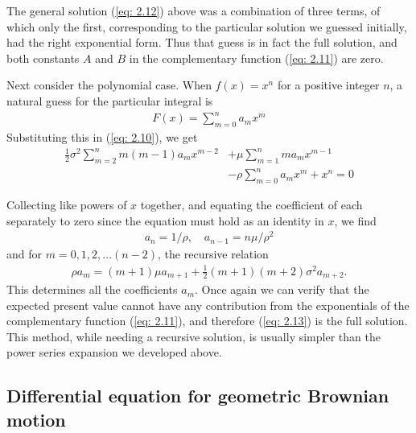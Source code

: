 \documentclass[\topdir/lecture\_notes.tex]{subfiles}
\begin{document}
\begin{optional}
The general solution (\ref{eq: 2.12}) above was a combination of three terms, of which only the first, corresponding to the particular solution we guessed initially, had the right exponential form. Thus that guess is in fact the full solution, and both constants $A$ and $B$ in the complementary function (\ref{eq: 2.11}) are zero.

Next consider the polynomial case. When $f(x)=x^{n}$ for a positive integer $n$, a natural guess for the particular integral is
\begin{align}
F(x)=\sum_{m=0}^{n} a_{m} x^{m} \label{eq: 2.13}
\end{align}
Substituting this in (\ref{eq: 2.10}), we get
\begin{align*}
\frac{1}{2} \sigma^{2} \sum_{m=2}^{n} m(m-1) a_{m} x^{m-2} & +\mu \sum_{m=1}^{n} m a_{m} x^{m-1} \\
& -\rho \sum_{m=0}^{n} a_{m} x^{m}+x^{n}=0
\end{align*}

Collecting like powers of $x$ together, and equating the coefficient of each separately to zero since the equation must hold as an identity in $x$, we find
\begin{align*}
a_{n}=1 / \rho, \quad a_{n-1}=n \mu / \rho^{2}
\end{align*}
and for $m=0,1,2, \ldots(n-2)$, the recursive relation
\begin{align}
\rho a_{m}=(m+1) \mu a_{m+1}+\frac{1}{2}(m+1)(m+2) \sigma^{2} a_{m+2}. \label{eq: 2.14}
\end{align}
This determines all the coefficients $a_{m}$. Once again we can verify that the expected present value cannot have any contribution from the exponentials of the complementary function (\ref{eq: 2.11}), and therefore (\ref{eq: 2.13}) is the full solution. This method, while needing a recursive solution, is usually simpler than the power series expansion we developed above.

\subsection{Differential equation for geometric Brownian motion}


\end{optional}
\end{document}
